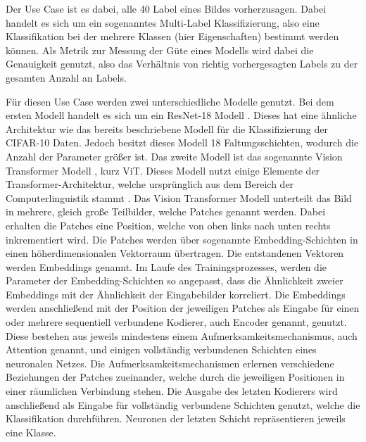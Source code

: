 Der Use Case ist es dabei, alle 40 Label eines Bildes vorherzusagen.
Dabei handelt es sich um ein sogenanntes Multi-Label Klassifizierung, also eine Klassifikation bei der mehrere Klassen (hier Eigenschaften) bestimmt werden können.
Als Metrik zur Messung der Güte eines Modells wird dabei die Genauigkeit genutzt, also das Verhältnis von richtig vorhergesagten Labels zu der gesamten Anzahl an Labels.

Für diesen Use Case werden zwei unterschiedliche Modelle genutzt.
Bei dem ersten Modell handelt es sich um ein ResNet-18 Modell \cite{resnet}.
Dieses hat eine ähnliche Architektur wie das bereits beschriebene Modell für die Klassifizierung der CIFAR-10 Daten.
Jedoch besitzt dieses Modell 18 Faltungsschichten, wodurch die Anzahl der Parameter größer ist.
Das zweite Modell ist das sogenannte Vision Transformer Modell \cite{vit}, kurz ViT. 
Dieses Modell nutzt einige Elemente der Transformer-Architektur, welche ursprünglich aus dem Bereich der Computerlinguistik stammt \cite{transformer}. 
Das Vision Transformer Modell unterteilt das Bild in mehrere, gleich große Teilbilder, welche Patches genannt werden.
Dabei erhalten die Patches eine Position, welche von oben links nach unten rechts inkrementiert wird.
Die Patches werden über sogenannte Embedding-Schichten in einen höherdimensionalen Vektorraum übertragen.
Die entstandenen Vektoren werden Embeddings genannt.
Im Laufe des Trainingsprozesses, werden die Parameter der Embedding-Schichten so angepasst, dass die Ähnlichkeit zweier Embeddings mit der Ähnlichkeit der Eingabebilder korreliert. 
Die Embeddings werden anschließend mit der Position der jeweiligen Patches als Eingabe für einen oder mehrere sequentiell verbundene Kodierer, auch Encoder genannt, genutzt.
Diese bestehen aus jeweils mindestens einem Aufmerksamkeitsmechanismus, auch Attention genannt, und einigen vollständig verbundenen Schichten eines neuronalen Netzes.
Die Aufmerksamkeitsmechanismen erlernen verschiedene Beziehungen der Patches zueinander, welche durch die jeweiligen Positionen in einer räumlichen Verbindung stehen.
Die Ausgabe des letzten Kodierers wird anschließend als Eingabe für vollständig verbundene Schichten genutzt, welche die Klassifikation durchführen.
Neuronen der letzten Schicht repräsentieren jeweils eine Klasse.